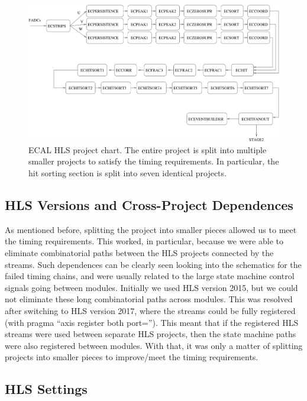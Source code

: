\begin{figure}[hbt]
	\centering
	\includegraphics[width=1.0\columnwidth,keepaspectratio]{img/hls_chart.png}
	\caption{ECAL HLS project chart. The entire project is split into multiple smaller projects to satisfy the
          timing requirements. In particular, the hit sorting section is split into seven identical projects.}
	\label{fig:hls_chart}
\end{figure}

\subsection{HLS Versions and Cross-Project Dependences}

As mentioned before, splitting the project into smaller pieces allowed us to meet the timing requirements. This
worked, in particular, because we were able to eliminate combinatorial paths between the HLS projects
connected by the streams. Such dependences can be clearly seen looking into the schematics for the failed
timing chains, and were usually related to the large state machine control signals going between modules.
Initially we used HLS version 2015, but we could not eliminate these long combinatorial paths across modules.
This was resolved after switching to HLS version 2017, where the streams could be fully registered (with
pragma ``axis register both port=''). This meant that if the registered HLS streams were used between
separate HLS projects, then the state machine paths were also registered between modules. With that, it
was only a matter of splitting projects into smaller pieces to improve/meet the timing requirements.

\subsection{HLS Settings}


